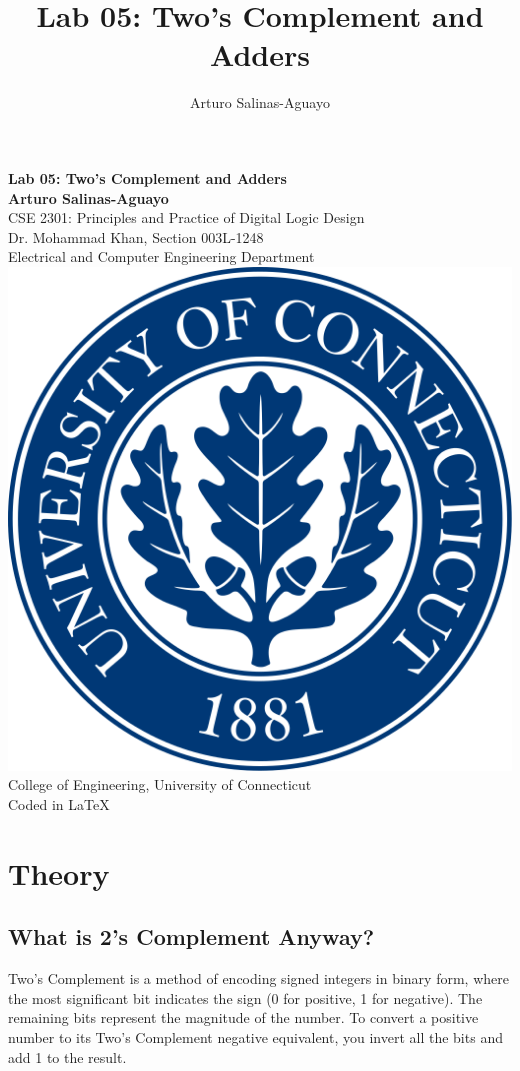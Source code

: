 \documentclass[12pt]{article}
\author{Arturo Salinas-Aguayo}
\title{Lab 05: Two's Complement and Adders}
\begin{document}
\newcommand{\closure}[2][3]{%
	{}\mkern#1mu\overline{\mkern-#1mu#2}}
\newcommand\ncoverline[1]{\mkern1mu\overline{\mkern-1mu#1\mkern-1mu}\mkern1mu}
\begin{titlepage}
	\centering
	\vspace*{3cm}
	\huge\textbf{Lab 05: Two's Complement and Adders}\\
	\vspace{5cm}
	\Large\textbf{Arturo Salinas-Aguayo}\\
	\normalsize
	CSE 2301: Principles and Practice of Digital Logic Design\\
	Dr. Mohammad Khan, Section 003L-1248\\
	Electrical and Computer Engineering Department
	\vfill
	\includegraphics[scale=0.1]{uconnlogo}\\
	College of Engineering, University of Connecticut\\
	\scriptsize{Coded in \LaTeX}
	\vspace*{1cm}
\end{titlepage}
\section*{Theory}
\subsection*{What is 2’s Complement Anyway?}
Two’s Complement is a method of encoding signed integers in binary form, where the most significant bit indicates the sign (0 for positive, 1 for negative). The remaining bits represent the magnitude of the number. To convert a positive number to its Two’s Complement negative equivalent, you invert all the bits and add 1 to the result.
\end{document}
